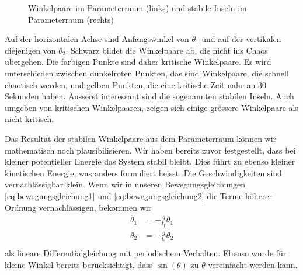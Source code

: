 \begin{figure}
\begin{minipage}{0.45\textwidth}
    \end{minipage}
    \caption{Winkelpaare im Parameterraum (links) und stabile Inseln im Parameterraum (rechts)
    \cite{doppelpendel:wettbewerbsarbeit}}
    \label{fig:Parameterraum}
\end{figure}
Auf der horizontalen Achse sind Anfangswinkel von \(\theta_1\) und
auf der vertikalen diejenigen von \(\theta_2\).
Schwarz bildet die Winkelpaare ab, die nicht ins Chaos übergehen.
Die farbigen Punkte sind daher kritische Winkelpaare.
Es wird unterschieden zwischen dunkelroten Punkten,
das sind Winkelpaare, die schnell chaotisch werden, und
gelben Punkten, die eine kritische Zeit nahe an 30 Sekunden haben.
Äusserst interessant sind die sogenannten stabilen Inseln.
Auch umgeben von kritischen Winkelpaaren, zeigen sich einige
grössere Winkelpaare als nicht kritisch.

Das Resultat der stabilen Winkelpaare aus dem Parameterraum können wir mathematisch noch plausibilisieren.
Wir haben bereits zuvor festgestellt, dass bei kleiner potentieller Energie das System stabil bleibt.
Dies führt zu ebenso kleiner kinetischen Energie, was anders formuliert heisst:
Die Geschwindigkeiten sind vernachlässigbar klein.
Wenn wir in unseren Bewegungsgleichungen
\eqref{eq:bewegungsgleichung1} und \eqref{eq:bewegungsgleichung2}
die Terme höherer Ordnung vernachlässigen, bekommen wir
\begin{align*}
\ddot{\theta_1} &= -\frac{g}{l_1} \theta_1\\
\ddot{\theta_2} &= -\frac{g}{l_2} \theta_2\\
\end{align*}
als lineare Differentialgleichung mit periodischem Verhalten.
Ebenso wurde für kleine Winkel bereits berücksichtigt,
dass \(\sin(\theta)\) zu \(\theta\) vereinfacht werden kann.

